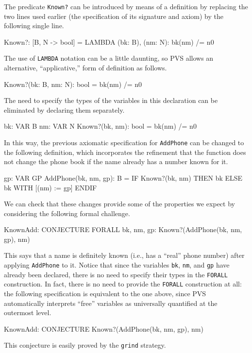 The predicate {\tt Known?} can be introduced by means of a definition
by replacing the two lines used earlier (the specification of its
signature and axiom) by the following single line.
\begin{jmrsession}
  Known?: [B, N -> bool] = LAMBDA (bk: B), (nm: N): bk(nm) /= n0
\end{jmrsession}
The use of {\tt LAMBDA} notation can be a little daunting, so PVS allows an
alternative, ``applicative,'' form of definition as follows.
\begin{jmrsession}
  Known?(bk: B, nm: N): bool = bk(nm) /= n0
\end{jmrsession}
The need to specify the types of the variables in this declaration
can be eliminated by declaring them separately.
\begin{jmrsession}
  bk: VAR B
  nm: VAR N
  Known?(bk, nm): bool = bk(nm) /= n0
\end{jmrsession}
In this way, the previous axiomatic specification for {\tt AddPhone} can be
changed to the following definition, which incorporates the refinement
that the function does not change the phone book if the name already
has a number known for it.
\begin{jmrsession}
  gp: VAR GP
  AddPhone(bk, nm, gp): B = 
    IF Known?(bk, nm) THEN bk ELSE bk WITH [(nm) := gp] ENDIF
\end{jmrsession}
We can check that these changes provide some of the properties we
expect by considering the following formal challenge.
\begin{jmrsession}
  KnownAdd: CONJECTURE  FORALL bk, nm, gp: Known?(AddPhone(bk, nm, gp), nm)
\end{jmrsession}
This says that a name is definitely known (i.e., has a ``real'' phone
number) after applying {\tt AddPhone} to it.   Notice that since the
variables {\tt bk}, {\tt nm}, and {\tt gp} have already been declared,
there is no need to specify their types in the {\tt FORALL} construction.
In fact, there is no need to provide the {\tt FORALL} construction at all:
the following specification is equivalent to the one above, since PVS
automatically interprets ``free'' variables as universally quantified
at the outermost level.
\begin{jmrsession}
  KnownAdd: CONJECTURE  Known?(AddPhone(bk, nm, gp), nm)
\end{jmrsession}
This conjecture is easily proved by the {\tt grind} strategy.


